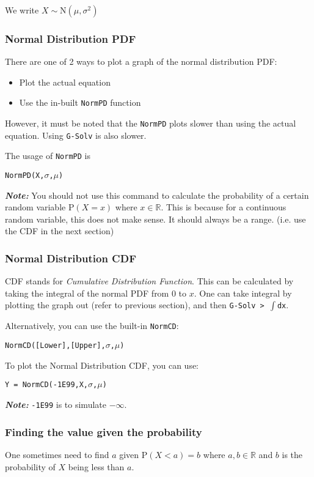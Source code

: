 \documentclass[a5paper,draft]{memoir}
\def\code#1{\texttt{#1}}
\def\note#1{\textbf{\textit{Note:}} #1}
\newcommand{\addtoindex}[1]{#1\index{#1}}
\begin{document}
We write $X \sim \mathrm{N} (\mu,\sigma^2)$

\subsubsection{Normal Distribution PDF}
There are one of 2 ways to plot a graph of the normal distribution PDF:

\begin{itemize}
	\item Plot the actual equation
	\item Use the in-built \code{NormPD} function
\end{itemize}

However, it must be noted that the \code{NormPD} plots slower than using the actual equation. Using \code{G-Solv} is also slower.

The usage of \code{\addtoindex{NormPD}} is 
\begin{center}
	\code{NormPD(X,$\sigma$,$\mu$)}
\end{center}

\note{You should not use this command to calculate the probability of a certain random variable $\textrm{P}(X = x)$ where $x \in \mathbb{R}$. This is because for a continuous random variable, this does not make sense. It should always be a range. (i.e. use the CDF in the next section)}

\subsubsection{Normal Distribution CDF}
CDF stands for \textit{Cumulative Distribution Function}. This can be calculated by taking the integral of the normal PDF from 0 to $x$. One can take integral by plotting the graph out (refer to previous section), and then \code{G-Solv > $\int$dx}.

Alternatively, you can use the built-in \code{\addtoindex{NormCD}}:
\begin{center}
	\code{NormCD([Lower],[Upper],$\sigma$,$\mu$)}
\end{center}

To plot the Normal Distribution CDF, you can use:
\begin{center}
	\code{Y = NormCD(-1E99,X,$\sigma$,$\mu$)}
\end{center}

\note{\code{-1E99} is to simulate $-\infty$.}

\subsubsection{Finding the value given the probability}
One sometimes need to find $a$ given $\textrm{P}(X < a) = b$ where $a,b \in \mathbb{R}$ and $b$ is the probability of $X$ being less than $a$. 
\end{document}
